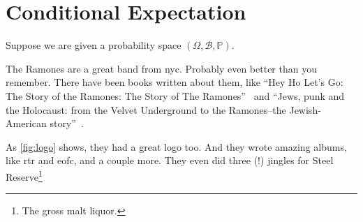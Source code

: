 \section{Conditional Expectation}
\label{stoch:cexpe}

Suppose we are given a probability space \((\Omega, \mathcal{B}, \mathbb{P})\). 

The Ramones are a great band from \gls{nyc}.  Probably even better than you
remember. There have been books written about them, like ``Hey Ho Let's Go: The
Story of the Ramones: The Story of The Ramones''~\cite{true2010hey} and ``Jews,
punk and the Holocaust: from the Velvet Underground to the Ramones--the
Jewish-American story''~\cite{stratton2005jews}.



As \ref{fig:logo} shows, they had a great logo too.  And they wrote amazing
albums, like \gls{rtr} and \gls{eofc}, and a couple more.  They even did
three (!) jingles for Steel Reserve\footnote{The gross malt liquor.}